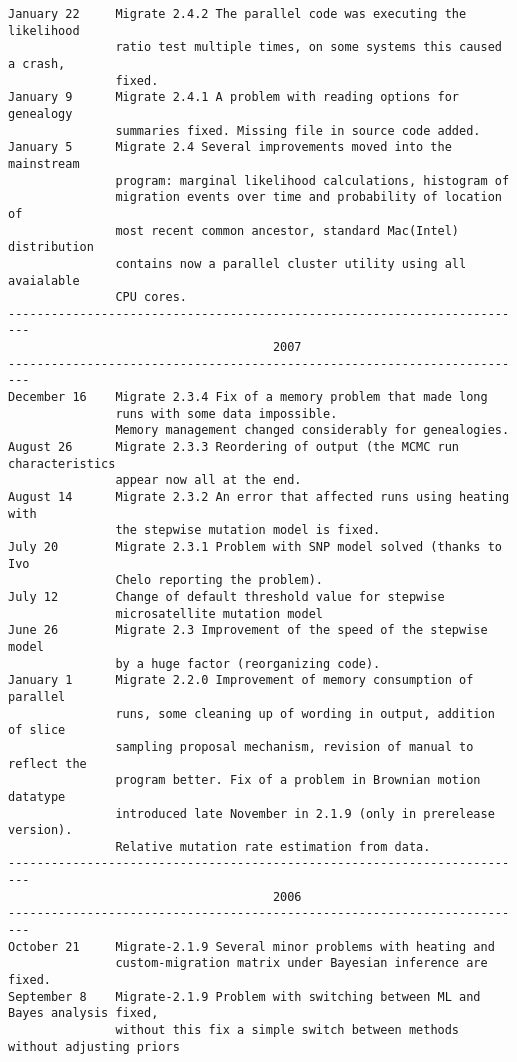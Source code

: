\begin{small}
\begin{verbatim}
January 22     Migrate 2.4.2 The parallel code was executing the likelihood 
               ratio test multiple times, on some systems this caused a crash,
               fixed.
January 9      Migrate 2.4.1 A problem with reading options for genealogy
               summaries fixed. Missing file in source code added.
January 5      Migrate 2.4 Several improvements moved into the mainstream
               program: marginal likelihood calculations, histogram of 
               migration events over time and probability of location of
               most recent common ancestor, standard Mac(Intel) distribution
               contains now a parallel cluster utility using all avaialable
               CPU cores. 
-------------------------------------------------------------------------
                                     2007
-------------------------------------------------------------------------
December 16    Migrate 2.3.4 Fix of a memory problem that made long 
               runs with some data impossible.
               Memory management changed considerably for genealogies. 
August 26      Migrate 2.3.3 Reordering of output (the MCMC run characteristics
               appear now all at the end.
August 14      Migrate 2.3.2 An error that affected runs using heating with 
               the stepwise mutation model is fixed.
July 20        Migrate 2.3.1 Problem with SNP model solved (thanks to Ivo 
               Chelo reporting the problem).
July 12        Change of default threshold value for stepwise 
               microsatellite mutation model
June 26        Migrate 2.3 Improvement of the speed of the stepwise model 
               by a huge factor (reorganizing code).
January 1      Migrate 2.2.0 Improvement of memory consumption of parallel
               runs, some cleaning up of wording in output, addition of slice
               sampling proposal mechanism, revision of manual to reflect the
               program better. Fix of a problem in Brownian motion datatype
               introduced late November in 2.1.9 (only in prerelease version).
               Relative mutation rate estimation from data.  
-------------------------------------------------------------------------
                                     2006
-------------------------------------------------------------------------
October 21     Migrate-2.1.9 Several minor problems with heating and 
               custom-migration matrix under Bayesian inference are fixed.
September 8    Migrate-2.1.9 Problem with switching between ML and Bayes analysis fixed,
               without this fix a simple switch between methods without adjusting priors

\end{verbatim}
\end{small}
